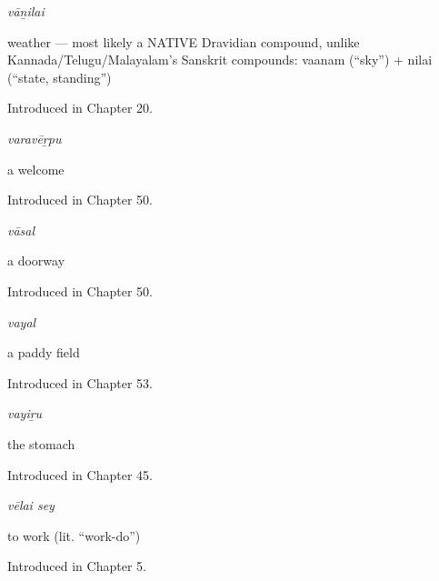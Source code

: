 \noindent\begin{minipage}[t]{\linewidth}
\raggedright
\textbf{}\enspace\emph{vāṉilai}\par
\small weather — most likely a NATIVE Dravidian compound, unlike Kannada/Telugu/Malayalam's Sanskrit compounds: vaanam (\textquotedblleft{}sky\textquotedblright{}) + nilai (\textquotedblleft{}state, standing\textquotedblright{})\par
\footnotesize Introduced in Chapter 20.
\end{minipage}\par\medskip

\noindent\begin{minipage}[t]{\linewidth}
\raggedright
\textbf{}\enspace\emph{varavēṟpu}\par
\small a welcome\par
\footnotesize Introduced in Chapter 50.
\end{minipage}\par\medskip

\noindent\begin{minipage}[t]{\linewidth}
\raggedright
\textbf{}\enspace\emph{vāsal}\par
\small a doorway\par
\footnotesize Introduced in Chapter 50.
\end{minipage}\par\medskip

\noindent\begin{minipage}[t]{\linewidth}
\raggedright
\textbf{}\enspace\emph{vayal}\par
\small a paddy field\par
\footnotesize Introduced in Chapter 53.
\end{minipage}\par\medskip

\noindent\begin{minipage}[t]{\linewidth}
\raggedright
\textbf{}\enspace\emph{vayiṟu}\par
\small the stomach\par
\footnotesize Introduced in Chapter 45.
\end{minipage}\par\medskip

\noindent\begin{minipage}[t]{\linewidth}
\raggedright
\textbf{ }\enspace\emph{vēlai sey}\par
\small to work (lit. \textquotedblleft{}work-do\textquotedblright{})\par
\footnotesize Introduced in Chapter 5.
\end{minipage}\par\medskip

